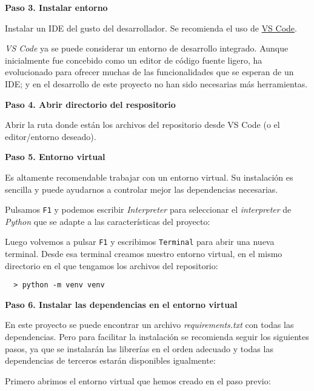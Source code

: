 \textbf{Paso 3. Instalar entorno}

Instalar un IDE del gusto del desarrollador. Se recomienda el uso de \href{https://code.visualstudio.com/download}{VS Code}.

\emph{VS Code} ya se puede considerar un entorno de desarrollo integrado. Aunque inicialmente fue concebido como un editor de código fuente ligero, ha evolucionado para ofrecer muchas de las funcionalidades que se esperan de un IDE; y en el desarrollo de este proyecto no han sido necesarias más herramientas. 




\textbf{Paso 4. Abrir directorio del respositorio}

Abrir la ruta donde están los archivos del repositorio desde VS Code (o el editor/entorno deseado).



\textbf{Paso 5. Entorno virtual}

Es altamente recomendable trabajar con un entorno virtual. Su instalación es sencilla y puede ayudarnos a controlar mejor las dependencias necesarias.

Pulsamos \texttt{F1} y podemos escribir \emph{Interpreter} para seleccionar el \emph{interpreter} de \emph{Python} que se adapte a las características del proyecto: 


Luego volvemos a pulsar \texttt{F1} y escribimos \texttt{Terminal} para abrir una nueva terminal. Desde esa terminal creamos nuestro entorno virtual, en el mismo directorio en el que tengamos los archivos del repositorio:

\begin{verbatim}
  > python -m venv venv
\end{verbatim}



\textbf{Paso 6. Instalar las dependencias en el entorno virtual}

En este proyecto se puede encontrar un archivo \emph{requirements.txt} con todas las dependencias. Pero para facilitar la instalación se recomienda seguir los siguientes pasos, ya que se instalarán las librerías en el orden adecuado y todas las dependencias de terceros estarán disponibles igualmente:

Primero abrimos el entorno virtual que hemos creado en el paso previo:

